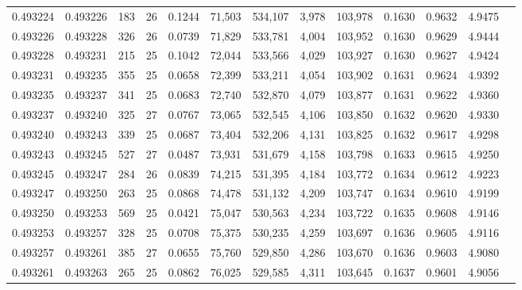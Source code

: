 \begin{tabular}{rrrrrrrrrrrrr}
0.493224 & 0.493226 & 183 &  26 &                                     0.1244 &  71,503 & 534,107 &   3,978 & 103,978 & 0.1630 & 0.9632 & 4.9475 \\
0.493226 & 0.493228 & 326 &  26 &                                     0.0739 &  71,829 & 533,781 &   4,004 & 103,952 & 0.1630 & 0.9629 & 4.9444 \\
0.493228 & 0.493231 & 215 &  25 &                                     0.1042 &  72,044 & 533,566 &   4,029 & 103,927 & 0.1630 & 0.9627 & 4.9424 \\
0.493231 & 0.493235 & 355 &  25 &                                     0.0658 &  72,399 & 533,211 &   4,054 & 103,902 & 0.1631 & 0.9624 & 4.9392 \\
0.493235 & 0.493237 & 341 &  25 &                                     0.0683 &  72,740 & 532,870 &   4,079 & 103,877 & 0.1631 & 0.9622 & 4.9360 \\
0.493237 & 0.493240 & 325 &  27 &                                     0.0767 &  73,065 & 532,545 &   4,106 & 103,850 & 0.1632 & 0.9620 & 4.9330 \\
0.493240 & 0.493243 & 339 &  25 &                                     0.0687 &  73,404 & 532,206 &   4,131 & 103,825 & 0.1632 & 0.9617 & 4.9298 \\
0.493243 & 0.493245 & 527 &  27 &                                     0.0487 &  73,931 & 531,679 &   4,158 & 103,798 & 0.1633 & 0.9615 & 4.9250 \\
0.493245 & 0.493247 & 284 &  26 &                                     0.0839 &  74,215 & 531,395 &   4,184 & 103,772 & 0.1634 & 0.9612 & 4.9223 \\
0.493247 & 0.493250 & 263 &  25 &                                     0.0868 &  74,478 & 531,132 &   4,209 & 103,747 & 0.1634 & 0.9610 & 4.9199 \\
0.493250 & 0.493253 & 569 &  25 &                                     0.0421 &  75,047 & 530,563 &   4,234 & 103,722 & 0.1635 & 0.9608 & 4.9146 \\
0.493253 & 0.493257 & 328 &  25 &                                     0.0708 &  75,375 & 530,235 &   4,259 & 103,697 & 0.1636 & 0.9605 & 4.9116 \\
0.493257 & 0.493261 & 385 &  27 &                                     0.0655 &  75,760 & 529,850 &   4,286 & 103,670 & 0.1636 & 0.9603 & 4.9080 \\
0.493261 & 0.493263 & 265 &  25 &                                     0.0862 &  76,025 & 529,585 &   4,311 & 103,645 & 0.1637 & 0.9601 & 4.9056 \\

\end{tabular}
